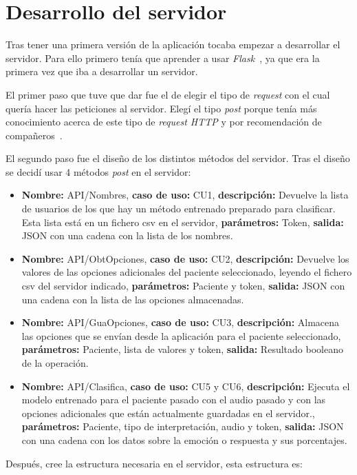 \section{Desarrollo del servidor}
Tras tener una primera versión de la aplicación tocaba empezar a desarrollar el servidor. Para ello primero tenía que aprender a usar \textit{Flask}~\cite{flask}, ya que era la primera vez que iba a desarrollar un servidor.

El primer paso que tuve que dar fue el de elegir el tipo de \textit{request} con el cual quería hacer las peticiones al servidor. Elegí el tipo \textit{post} porque tenía más conocimiento acerca de este tipo de \textit{request HTTP} y por recomendación de compañeros~\cite{sdintro,sdhttp}.

El segundo paso fue el diseño de los distintos métodos del servidor. Tras el diseño se decidí usar 4 métodos \textit{post} en el servidor:
\begin{itemize}
	\item \textbf{Nombre:} API/Nombres, \textbf{caso de uso:} CU1, \textbf{descripción:} Devuelve la lista de usuarios de los que hay un método entrenado preparado para clasificar. Esta lista está en un fichero csv en el servidor, \textbf{parámetros:} Token, \textbf{salida:} JSON con una cadena con la lista de los nombres.
	\item \textbf{Nombre:} API/ObtOpciones, \textbf{caso de uso:} CU2, \textbf{descripción:} Devuelve los valores de las opciones adicionales del paciente seleccionado, leyendo el fichero csv del servidor indicado, \textbf{parámetros:} Paciente y token, \textbf{salida:} JSON con una cadena con la lista de las opciones almacenadas.
	\item \textbf{Nombre:} API/GuaOpciones, \textbf{caso de uso:} CU3, \textbf{descripción:} Almacena las opciones que se envían desde la aplicación para el paciente seleccionado, \textbf{parámetros:} Paciente, lista de valores y token, \textbf{salida:} Resultado booleano de la operación.
	\item \textbf{Nombre:} API/Clasifica, \textbf{caso de uso:} CU5 y CU6, \textbf{descripción:} Ejecuta el modelo entrenado para el paciente pasado con el audio pasado y con las opciones adicionales que están actualmente guardadas en el servidor., \textbf{parámetros:} Paciente, tipo de interpretación, audio y token, \textbf{salida:} JSON con una cadena con los datos sobre la emoción o respuesta y sus porcentajes.
\end{itemize}

Después, cree la estructura necesaria en el servidor, esta estructura es:

